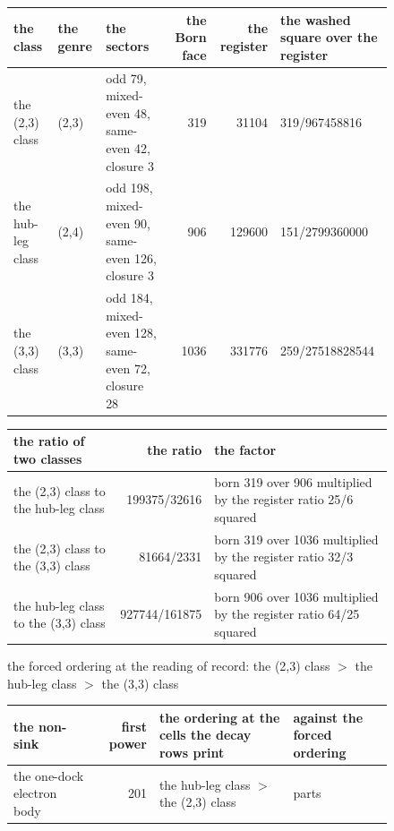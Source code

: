 \begin{figure}[htbp]\centering
{\scriptsize\setlength{\tabcolsep}{3pt}\begin{adjustbox}{max width=\linewidth}\begin{tabular}{p{22mm}p{12mm}p{34mm}rrp{40mm}}
the class & the genre & the sectors & the Born face & the register & the washed square over the register \\ \hline
the (2,3) class & (2,3) & odd 79, mixed-even 48, same-even 42, closure 3 & 319 & 31104 & 319/967458816 \\
the hub-leg class & (2,4) & odd 198, mixed-even 90, same-even 126, closure 3 & 906 & 129600 & 151/2799360000 \\
the (3,3) class & (3,3) & odd 184, mixed-even 128, same-even 72, closure 28 & 1036 & 331776 & 259/27518828544 \\
\end{tabular}\end{adjustbox}}
\par\smallskip
{\scriptsize\begin{adjustbox}{max width=\linewidth}\begin{tabular}{p{50mm}rp{80mm}}
the ratio of two classes & the ratio & the factor \\ \hline
the (2,3) class to the hub-leg class & 199375/32616 & born 319 over 906 multiplied by the register ratio 25/6 squared \\
the (2,3) class to the (3,3) class & 81664/2331 & born 319 over 1036 multiplied by the register ratio 32/3 squared \\
the hub-leg class to the (3,3) class & 927744/161875 & born 906 over 1036 multiplied by the register ratio 64/25 squared \\
\end{tabular}\end{adjustbox}}
\par\smallskip
{\footnotesize the forced ordering at the reading of record: the (2,3) class $>$ the hub-leg class $>$ the (3,3) class}
\par\smallskip
{\scriptsize\setlength{\tabcolsep}{3pt}\begin{adjustbox}{max width=\linewidth}\begin{tabular}{p{44mm}rp{52mm}p{24mm}}
the non-sink & first power & the ordering at the cells the decay rows print & against the forced ordering \\ \hline
the one-dock electron body & 201 & the hub-leg class $>$ the (2,3) class & parts \\

\end{tabular}
\end{adjustbox}}
\end{figure}
